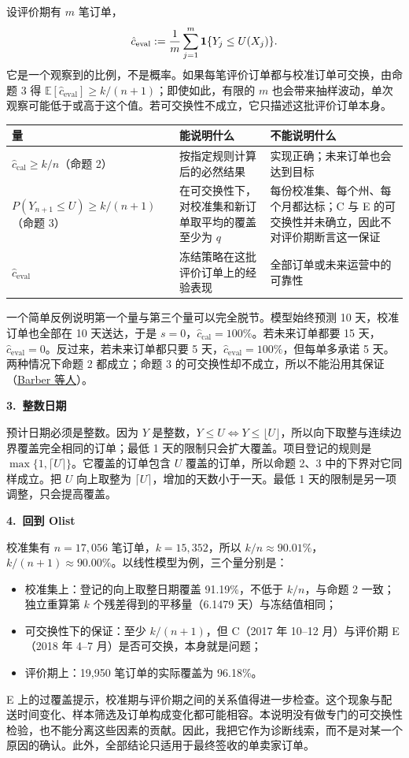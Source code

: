\documentclass[11pt]{article}
\begin{document}
设评价期有 \(m\) 笔订单，
\[
\hat c_{\mathrm{eval}}:=\frac1m\sum_{j=1}^m \mathbf 1\{Y_j\le U(X_j)\}.
\]
它是一个观察到的比例，不是概率。如果每笔评价订单都与校准订单可交换，由命题 3 得 \(\mathbb E[\hat c_{\mathrm{eval}}]\ge k/(n+1)\)；即使如此，有限的 \(m\) 也会带来抽样波动，单次观察可能低于或高于这个值。若可交换性不成立，它只描述这批评价订单本身。

\begin{center}
\small
\begin{tabular}{>{\raggedright\arraybackslash}p{}>{\raggedright\arraybackslash}p{}>{\raggedright\arraybackslash}p{}}
\toprule
量 & 能说明什么 & 不能说明什么\\
\midrule
\(\hat c_{\mathrm{cal}}\ge k/n\)（命题 2） & 按指定规则计算后的必然结果 & 实现正确；未来订单也会达到目标\\
\(P(Y_{n+1}\le U)\ge k/(n+1)\)（命题 3） & 在可交换性下，对校准集和新订单取平均的覆盖至少为 \(q\) & 每份校准集、每个州、每个月都达标；C 与 E 的可交换性并未确立，因此不对评价期断言这一保证\\
\(\hat c_{\mathrm{eval}}\) & 冻结策略在这批评价订单上的经验表现 & 全部订单或未来运营中的可靠性\\
\bottomrule
\end{tabular}
\end{center}

一个简单反例说明第一个量与第三个量可以完全脱节。模型始终预测 10 天，校准订单也全部在 10 天送达，于是 \(s=0\)，\(\hat c_{\mathrm{cal}}=100\%\)。若未来订单都要 15 天，\(\hat c_{\mathrm{eval}}=0\)。反过来，若未来订单都只要 5 天，\(\hat c_{\mathrm{eval}}=100\%\)，但每单多承诺 5 天。两种情况下命题 2 都成立；命题 3 的可交换性却不成立，所以不能沿用其保证（\href{https://arxiv.org/abs/2202.13415}{Barber 等人}）。

\bigskip
\textbf{3.\ 整数日期}

预计日期必须是整数。因为 \(Y\) 是整数，\(Y\le U\iff Y\le\lfloor U\rfloor\)，所以向下取整与连续边界覆盖完全相同的订单；最低 1 天的限制只会扩大覆盖。项目登记的规则是 \(\max\{1,\lceil U\rceil\}\)。它覆盖的订单包含 \(U\) 覆盖的订单，所以命题 2、3 中的下界对它同样成立。把 \(U\) 向上取整为 \(\lceil U\rceil\)，增加的天数小于一天。最低 1 天的限制是另一项调整，只会提高覆盖。

\bigskip
\textbf{4.\ 回到 Olist}

校准集有 \(n=17{,}056\) 笔订单，\(k=15{,}352\)，所以 \(k/n\approx90.01\%\)，\(k/(n+1)\approx90.00\%\)。以线性模型为例，三个量分别是：
\begin{itemize}\setlength{\itemsep}{0pt}
\item 校准集上：登记的向上取整日期覆盖 91.19\%，不低于 \(k/n\)，与命题 2 一致；独立重算第 \(k\) 个残差得到的平移量（6.1479 天）与冻结值相同；
\item 可交换性下的保证：至少 \(k/(n+1)\)，但 C（2017 年 10--12 月）与评价期 E（2018 年 4--7 月）是否可交换，本身就是问题；
\item 评价期上：19,950 笔订单的实际覆盖为 96.18\%。
\end{itemize}

E 上的过覆盖提示，校准期与评价期之间的关系值得进一步检查。这个现象与配送时间变化、样本筛选及订单构成变化都可能相容。本说明没有做专门的可交换性检验，也不能分离这些因素的贡献。因此，我把它作为诊断线索，而不是对某一个原因的确认。此外，全部结论只适用于最终签收的单卖家订单。
\end{document}
